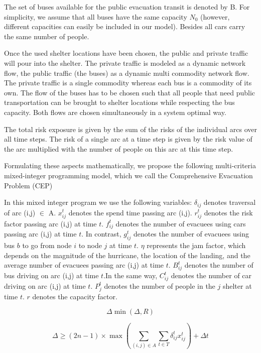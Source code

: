 \documentclass{mcmthesis}
\begin{document}
The set of buses available for the public evacuation transit is denoted by B. For simplicity, we assume that all buses have the same capacity ${N_0}$ (however, different capacities can easily be included in our model). Besides all cars carry the same number of people.

Once the used shelter locations have been chosen, the public and private traffic will pour into the shelter. The private traffic is modeled as a dynamic network flow, the public traffic (the buses) as a dynamic multi commodity network flow. The private traffic is a single commodity whereas each bus is a commodity of its own. The flow of the buses has to be chosen such that all people that need public transportation can be brought to shelter locations while respecting the bus capacity. Both flows are chosen simultaneously in a system optimal way.

The total risk exposure is given by the sum of the risks of the individual arcs over all time steps. The risk of a single arc at a time step is given by the risk value of the arc multiplied with the number of people on this arc at this time step.

Formulating these aspects mathematically, we propose the following multi-criteria mixed-integer programming model, which we call the Comprehensive Evacuation Problem (CEP)\cite{Murray2013Evacuation,Ng2015Sharp,Ng2010Reliable}

In this mixed integer program we use the following variables: $\delta _{ij}$ denotes traversal of arc (i,j) $ \in $ A. $x_{ij}^t$ denotes the spend time passing arc (i,j). $r_{ij}^t$ denotes the risk factor passing arc (i,j) at time $t$. $f_{ij}^t$ denotes the number of evacuees using cars passing arc (i,j) at time $t$. In contrast, $g_{ij}^t$ denotes the number of evacuees using bus $b$ to go from node $i$ to node $j$ at time $t$. $\eta $ represents the jam factor, which depends on the magnitude of the hurricane, the location of the landing, and the average number of evacuees passing arc (i,j) at time $t$. $B_{ij}^t$ denotes the number of bus driving on arc (i,j) at time $t$.In the same way, $C_{ij}^t$ denotes the number of car driving on arc (i,j) at time $t$. $P_j^t$  denotes the number of people in the $j$ shelter at time $t$. $r$ denotes the capacity factor.


\begin{equation}\label{3}
\Delta \min (\Delta ,R)
\end{equation}

\begin{equation}\label{4}
\Delta  \ge (2n - 1) \times \max (\sum\limits_{(i,j) \in A} {\sum\limits_{t \in T} {\delta _{ij}^tx_{ij}^t} } ) + \Delta t
\end{equation}
\end{document}
